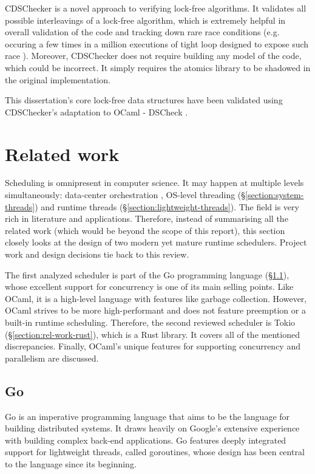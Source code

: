 \documentclass[12pt,a4paper,twoside]{report}
\begin{document}
CDSChecker \cite{Norris2013} is a novel approach to verifying lock-free algorithms. It validates all possible interleavings of a lock-free algorithm, which is extremely helpful in overall validation of the code and tracking down rare race conditions (e.g. occuring a few times in a million executions of tight loop designed to expose such race \cite{litmus}). Moreover, CDSChecker does not require building any model of the code, which could be incorrect. It simply requires the atomics library to be shadowed in the original implementation.

This dissertation's core lock-free data structures have been validated using CDSChecker's adaptation to OCaml - DSCheck \cite{sadiqjds97:online}. 


\chapter{Related work}

Scheduling is omnipresent in computer science. It may happen at multiple levels simultaneously: data-center orchestration \cite{NomadbyH95:online}, OS-level threading (\S\ref{section:system-threads}) and runtime threads (\S\ref{section:lightweight-threads}). The field is very rich in literature and applications. Therefore, instead of summarising all the related work (which would be beyond the scope of this report), this section closely looks at the design of two modern yet mature runtime schedulers. Project work and design decisions tie back to this review. 

The first analyzed scheduler is part of the Go programming language (\S\ref{section:rel-work-go}), whose excellent support for concurrency is one of its main selling points. Like OCaml, it is a high-level language with features like garbage collection. However, OCaml strives to be more high-performant and does not feature preemption or a built-in runtime scheduling. Therefore, the second reviewed scheduler is Tokio (\S\ref{section:rel-work-rust}), which is a Rust library. It covers all of the mentioned discrepancies. Finally, OCaml's unique features for supporting concurrency and parallelism are discussed. 

\section{Go}
\label{section:rel-work-go}
Go is an imperative programming language that aims to be the language for building distributed systems. It draws heavily on Google's extensive experience with building complex back-end applications. Go features deeply integrated support for lightweight threads, called goroutines, whose design has been central to the language since its beginning.
\end{document}
